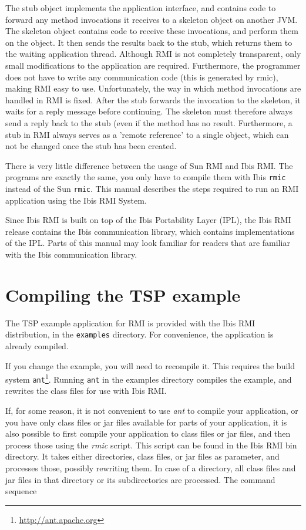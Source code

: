 \documentclass[a4paper,10pt]{article}
\begin{document}
The stub object implements the application interface, and contains
code to forward any method invocations it receives to a skeleton
object on another JVM. The skeleton object contains code to receive
these invocations, and perform them on the object. It then sends the
results back to the stub, which returns them to the waiting
application thread.  Although RMI is not completely transparent, only
small modifications to the application are required. Furthermore, the
programmer does not have to write any communication code (this is
generated by rmic), making RMI easy to use. Unfortunately, the way in
which method invocations are handled in RMI is fixed. After the stub
forwards the invocation to the skeleton, it waits for a reply message
before continuing. The skeleton must therefore always send a reply
back to the stub (even if the method has no result. Furthermore, a
stub in RMI always serves as a 'remote reference' to a single object,
which can not be changed once the stub has been created.

There is very little difference between the usage of Sun RMI and Ibis
RMI. The programs are exactly the same, you only have to compile them
with Ibis \texttt{rmic} instead of the Sun \texttt{rmic}. 
This manual describes the steps required to run an RMI application
using the Ibis RMI System.


Since Ibis RMI is built on top of the Ibis Portability Layer (IPL),
the Ibis RMI release contains the Ibis communication library, which contains
implementations of the IPL. Parts of this manual may look familiar for
readers that are familiar with the Ibis communication library.

\section{Compiling the TSP example}

The TSP example application for RMI is
provided with the Ibis RMI distribution, in the \texttt{examples} directory.
For convenience, the application is already compiled.

If you change the example, you will need to recompile it. This
requires the build system \texttt{ant}\footnote{\url{http://ant.apache.org}}.
Running \texttt{ant} in the examples directory compiles the example,
and rewrites the class files for use with Ibis RMI.

If, for some reason, it is not convenient to use \emph{ant} to compile
your application, or you have only class files or jar files available
for parts of your application, it is also possible to first compile
your application to class files or jar files, and then process those
using the \emph{rmic} script. This script can be found in the Ibis RMI
bin directory. It takes either directories, class files, or jar files
as parameter, and processes those, possibly rewriting them. In case
of a directory, all class files and jar files in that directory or
its subdirectories are processed.  The command sequence
\end{document}
